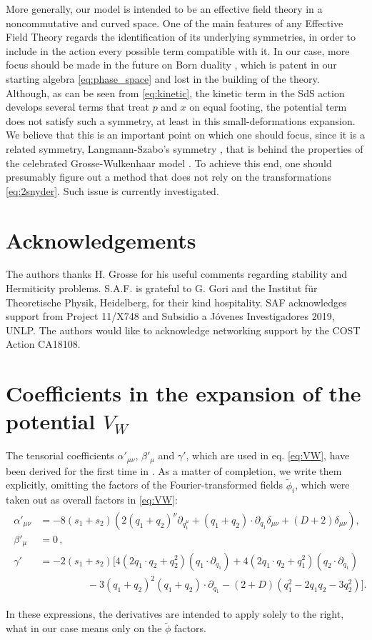 \documentclass[a4paper,10pt]{amsart}
\newcommand{\nocol}[1]{{#1}}
\begin{document}
 More generally, our model is intended to be an effective field theory in a noncommutative and curved space.
 One of the main features of any \nocol{Effective Field Theory} regards the identification of its underlying symmetries,
 in order to include in the action every possible term compatible with it.
 In our case, more focus should be made in the future on Born duality \cite{Born:1949},
 which is patent in our starting algebra \eqref{eq:phase_space}
 and lost in the building of the theory.
 Although, as can be seen from \eqref{eq:kinetic},
 the kinetic term in the SdS action develops several terms that treat $p$ and $x$ on equal footing,
 the potential term does not satisfy such a symmetry, at least in this small-deformations expansion.
 We believe that this is an important point on which one should focus, since it is a related symmetry, Langmann-Szabo's symmetry \cite{Langmann:2002cc},
 that is behind the properties of the celebrated Grosse-Wulkenhaar model \cite{Grosse:2005da}.
 To achieve this end, one should presumably figure out a method that does not rely on the transformations \eqref{eq:2snyder}.
 Such issue is currently investigated.



\section{Acknowledgements}
The authors thanks H. Grosse for his useful comments regarding stability and Hermiticity problems.
S.A.F. is grateful to G. Gori and the Institut für Theoretische Physik, Heidelberg, for their kind hospitality.
SAF acknowledges support from Project 11/X748 and Subsidio a Jóvenes Investigadores 2019, UNLP.
The authors would like to acknowledge networking support by the COST Action CA18108.

\appendix
\section{Coefficients in the expansion of the potential $V_W$}\label{app:coefficientsVW}
The tensorial coefficients $\alpha'_{\mu\nu}$, $\beta'_{\mu}$ and $\gamma'$, which are used in eq. \eqref{eq:VW},
have been derived for the first time in \cite{Franchino-Vinas:2018jcs}.
As a matter of completion, we write them explicitly, omitting the factors of the Fourier-transformed fields $\tilde\phi_i$,
which were taken out as overall factors in \eqref{eq:VW}:
\begin{align}
\begin{split}
 \alpha'_{\mu\nu}&=-8 (s_1+s_2) \left(2 (q_1+q_2)^{\nu}\partial_{q_1^{\mu}}+ (q_1+q_2)\cdot \partial_{q_1} \delta_{\mu\nu}+ (D+2)\delta_{\mu\nu}\right),\\
 \beta'_{\mu}&=0\,,\\
 \gamma'&=-2(s_1+s_2)  \Big[ 4(2q_1\cdot q_2+q_2^2)(q_1\cdot \partial_{q_1})+4(2q_1\cdot q_2+q_1^2)(q_2\cdot \partial_{q_1})\\
 &\hspace{2cm} -3 (q_1+q_2)^2 (q_1+q_2)\cdot \partial_{q_1}-  (2 + D) (q_1^2-2 q_1 q_2 - 3  q_2^2 ) \Big].
\end{split}
\end{align}

In these expressions, the derivatives are intended to apply solely to the right,
what in our case means only on the $\tilde\phi$ factors.
\printbibliography
\end{document}
